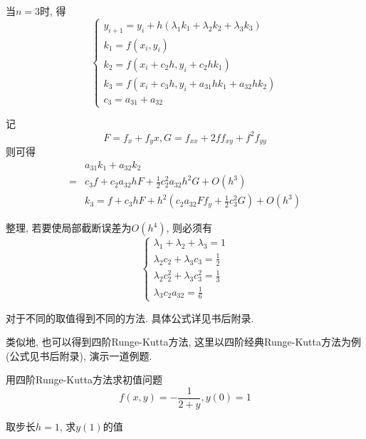 当$n=3$时, 得
\begin{equation*}
    \begin{cases}
        y_{i+1}=y_i+h(\lambda_1k_1+\lambda_2k_2+\lambda_3k_3)\\
        k_1=f(x_i,y_i)\\
        k_2=f(x_i+c_2h,y_i+c_2hk_1)\\
        k_3=f(x_i+c_3h,y_i+a_{31}hk_1+a_{32}hk_2)\\
        c_3=a_{31}+a_{32}
    \end{cases}
\end{equation*}

记
\begin{equation*}
    F=f_x+f_yx, G=f_{xx}+2ff_{xy}+f^2f_{yy}
\end{equation*}
则可得
\begin{align*}
    &a_{31}k_1+a_{32}k_2\\
    =&c_3f+c_2a_{32}hF+\frac{1}{2}c_2^2a_{32}h^2G+O(h^3)\\
    &k_3=f+c_3hF+h^2(c_2a_{32}Ff_y+\frac{1}{2}c_3^2G)+O(h^3)
\end{align*}

整理, 若要使局部截断误差为$O(h^4)$, 则必须有
\begin{equation*}
    \begin{cases}
        \lambda_1+\lambda_2+\lambda_3=1\\
        \lambda_2c_2+\lambda_3c_3=\frac{1}{2}\\
        \lambda_2c_2^2+\lambda_3c_3^2=\frac{1}{3}\\
        \lambda_3c_2a_{32}=\frac{1}{6}
    \end{cases}
\end{equation*}

对于不同的取值得到不同的方法. 具体公式详见书后附录.

类似地, 也可以得到四阶Runge-Kutta方法, 这里以四阶经典Runge-Kutta方法为例(公式见书后附录), 演示一道例题.

\begin{example}
    用四阶Runge-Kutta方法求初值问题
    \begin{equation*}
        f(x,y)=-\frac{1}{2+y}, y(0)=1
    \end{equation*}

    取步长$h=1$, 求$y(1)$的值
\end{example}

